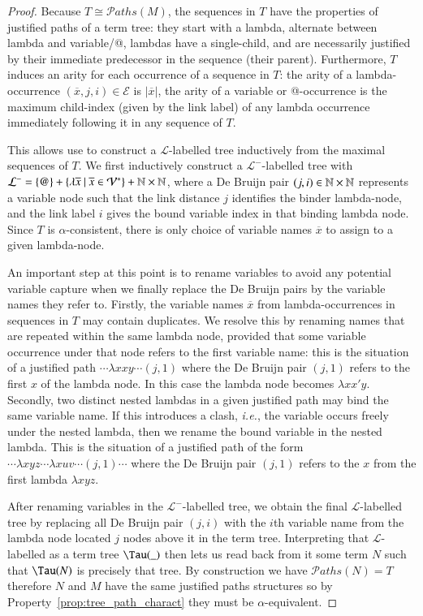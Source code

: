 \documentclass{elsarticle}
\makeatletter
\theoremstyle{plain}
\theoremstyle{definition}
\def\structisomorphic{\cong} %
\def\nameencoding{\mathcal{E}} %
\newcommand{\ctree}{\Tau} %
\newcommand\pathset{{\mathcal{P}aths}} %
\renewcommand\ie{{\it i.e.\@\xspace}}
\makeatother
\begin{document}
\begin{proof}
    Because $T \structisomorphic \pathset(M)$, the sequences in $T$ have the properties
of justified paths of a term tree: they start with a lambda, alternate between lambda and variable/@, lambdas have
a single-child, and are necessarily justified by their immediate predecessor in the sequence (their parent).
Furthermore, $T$ induces an arity for each occurrence of a sequence in $T$: the arity of a lambda-occurrence $(\overline{x},j,i)\in\nameencoding$ is $|\overline{x}|$, the arity of a variable or @-occurrence is the maximum
child-index (given by the link label) of any lambda occurrence immediately following it in any sequence of $T$.

This allows use to construct a $\mathcal{L}$-labelled tree
inductively from the maximal sequences of $T$.
We first inductively construct a $\mathcal{L^-}$-labelled tree with
$\mathcal{L^-} = \{ @ \} + \{
    \lambda \overline{x} \ | \
    \overline{x} \in \mathcal{V}^* \} + \mathbb{N}\times\mathbb{N}$,
where a De Bruijn pair $(j,i)\in \mathbb{N}\times\mathbb{N}$ represents a variable node such that the link distance $j$ identifies the binder lambda-node, and the link label $i$ gives the bound variable index in that binding lambda node. Since $T$ is $\alpha$-consistent, there is only choice of variable names $\overline{x}$ to assign to a given lambda-node.

An important step at this point is to rename variables to avoid any potential variable capture when we finally replace the De Bruijn pairs by the variable names they refer to.
%
Firstly, the variable names $\overline{x}$ from lambda-occurrences in sequences in $T$ may contain duplicates. We resolve this by renaming names that are repeated within the same lambda node, provided that some variable occurrence under that node refers to the first variable name: this is the situation of a justified path  $\cdots \lambda x x y \cdots (j,1)$ where the De Bruijn pair $(j,1)$ refers to the first $x$ of the lambda node. In this case the lambda node becomes $\lambda x x' y$.
%
Secondly, two distinct nested lambdas in a given justified path may bind the same variable name. If this introduces a clash, \ie, the variable occurs freely under the nested lambda, then we rename the bound variable in the nested lambda. This is the situation of a justified path of the form $\cdots \lambda{xyz} \cdots \lambda {xuv} \cdots (j,1) \cdots$
 where the De Bruijn pair $(j,1)$ refers to the $x$ from the first lambda $\lambda{x y z}$.

After renaming variables in the $\mathcal{L^-}$-labelled tree, we obtain the final $\mathcal{L}$-labelled tree by replacing all De Bruijn pair $(j,i)$ with the $i$th variable name from the lambda node located $j$ nodes above it in the term tree.
%
Interpreting that $\mathcal{L}$-labelled as a term tree $\ctree(\_ )$ then lets us read back from it some term $N$ such that $\ctree(N)$ is precisely that tree.
%
By construction we have $\pathset(N) = T$ therefore
$N$ and $M$ have the same justified paths structures so by
Property~\ref{prop:tree_path_charact} they must be $\alpha$-equivalent.
\end{proof}
\end{document}
